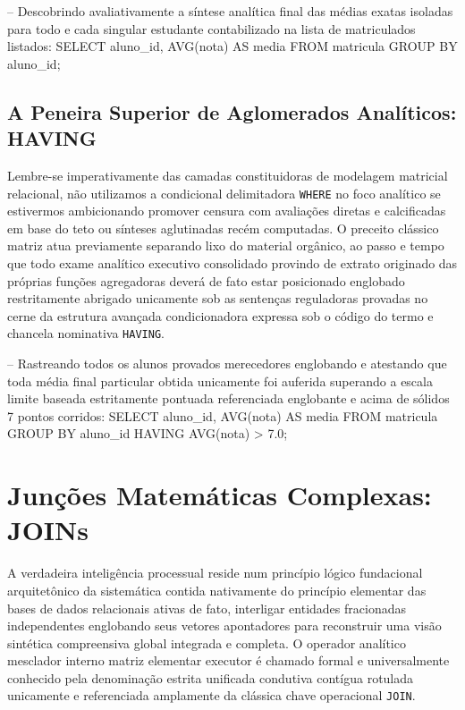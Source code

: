 \begin{sqlcode}
-- Descobrindo avaliativamente a síntese analítica final das médias exatas isoladas para todo e cada singular estudante contabilizado na lista de matriculados listados:
SELECT aluno_id, AVG(nota) AS media
FROM matricula
GROUP BY aluno_id;
\end{sqlcode}

\subsection{A Peneira Superior de Aglomerados Analíticos: HAVING}
Lembre-se imperativamente das camadas constituidoras de modelagem matricial relacional, não utilizamos a condicional delimitadora \texttt{WHERE} no foco analítico se estivermos ambicionando promover censura com avaliações diretas e calcificadas em base do teto ou sínteses aglutinadas recém computadas. O preceito clássico matriz atua previamente separando lixo do material orgânico, ao passo e tempo que todo exame analítico executivo consolidado provindo de extrato originado das próprias funções agregadoras deverá de fato estar posicionado englobado restritamente abrigado unicamente sob as sentenças reguladoras provadas no cerne da estrutura avançada condicionadora expressa sob o código do termo e chancela nominativa \texttt{HAVING}.

\begin{sqlcode}
-- Rastreando todos os alunos provados merecedores englobando e atestando que toda média final particular obtida unicamente foi auferida superando a escala limite baseada estritamente pontuada referenciada englobante e acima de sólidos 7 pontos corridos:
SELECT aluno_id, AVG(nota) AS media
FROM matricula
GROUP BY aluno_id
HAVING AVG(nota) > 7.0;
\end{sqlcode}

\section{Junções Matemáticas Complexas: JOINs}

A verdadeira inteligência processual reside num princípio lógico fundacional arquitetônico da sistemática contida nativamente do princípio elementar das bases de dados relacionais ativas de fato, interligar entidades fracionadas independentes englobando seus vetores apontadores para reconstruir uma visão sintética compreensiva global integrada e completa. O operador analítico mesclador interno matriz elementar executor é chamado formal e universalmente conhecido pela denominação estrita unificada condutiva contígua rotulada unicamente e referenciada amplamente da clássica chave operacional \texttt{JOIN}.

